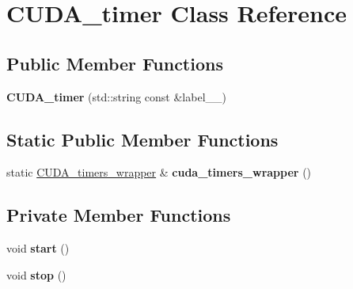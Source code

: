 \hypertarget{class_c_u_d_a__timer}{}\section{C\+U\+D\+A\+\_\+timer Class Reference}
\label{class_c_u_d_a__timer}
\subsection*{Public Member Functions}
\begin{DoxyCompactItemize}
\item 
\hypertarget{class_c_u_d_a__timer_a47a07308d68d553175ba4bb3c478572f}{}{\bfseries C\+U\+D\+A\+\_\+timer} (std\+::string const \&label\+\_\+\+\_\+)\label{class_c_u_d_a__timer_a47a07308d68d553175ba4bb3c478572f}

\end{DoxyCompactItemize}
\subsection*{Static Public Member Functions}
\begin{DoxyCompactItemize}
\item 
\hypertarget{class_c_u_d_a__timer_aa7968b6587c62a24d77b54b623cefb72}{}static \hyperlink{class_c_u_d_a__timers__wrapper}{C\+U\+D\+A\+\_\+timers\+\_\+wrapper} \& {\bfseries cuda\+\_\+timers\+\_\+wrapper} ()\label{class_c_u_d_a__timer_aa7968b6587c62a24d77b54b623cefb72}

\end{DoxyCompactItemize}
\subsection*{Private Member Functions}
\begin{DoxyCompactItemize}
\item 
\hypertarget{class_c_u_d_a__timer_a7f89a9f34ba2eb158c9b9bf0dcac1dba}{}void {\bfseries start} ()\label{class_c_u_d_a__timer_a7f89a9f34ba2eb158c9b9bf0dcac1dba}

\item 
\hypertarget{class_c_u_d_a__timer_ae7d6bb97094474f13f15afe192da9f51}{}void {\bfseries stop} ()\label{class_c_u_d_a__timer_ae7d6bb97094474f13f15afe192da9f51}

\end{DoxyCompactItemize}
